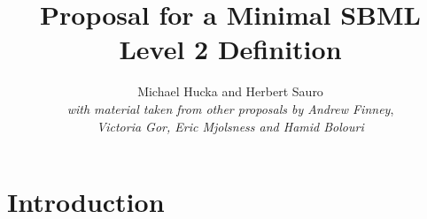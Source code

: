 \documentclass[10pt]{cekarticle}
\begin{document}
\title{Proposal for a Minimal SBML Level 2 Definition}

\author{Michael Hucka and Herbert Sauro\\[5pt]
\emph{\normalsize with material taken from other proposals by Andrew Finney},\\[-2pt]
\emph{\normalsize Victoria Gor, Eric Mjolsness and Hamid Bolouri}}


\address{Systems Biology Workbench Development Group\\
  ERATO Kitano Systems Biology Project\\
  Control and Dynamical Systems, MC 107-81\\
  California Institute of Technology, Pasadena, CA 91125, USA\\[3pt]
  {\url{http://www.cds.caltech.edu/erato}}}


\maketitle


\section{Introduction}
\end{document}
